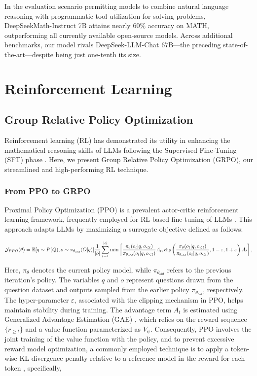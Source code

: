 \begin{itemize}[topsep=0pt]
\begin{itemize}[topsep=0pt]
In the evaluation scenario permitting models to combine natural language reasoning with programmatic tool utilization for solving problems, DeepSeekMath-Instruct 7B attains nearly 60\% accuracy on MATH, outperforming all currently available open-source models. Across additional benchmarks, our model rivals DeepSeek-LLM-Chat 67B—the preceding state-of-the-art—despite being just one-tenth its size.
\section{Reinforcement Learning}

\subsection{Group Relative Policy Optimization} Reinforcement learning (RL) has demonstrated its utility in enhancing the mathematical reasoning skills of LLMs following the Supervised Fine-Tuning (SFT) phase \citep{wang2023math,wizardmath}. Here, we present Group Relative Policy Optimization (GRPO), our streamlined and high-performing RL technique.

\subsubsection{From PPO to GRPO} Proximal Policy Optimization (PPO) \citep{schulman2017proximal} is a prevalent actor-critic reinforcement learning framework, frequently employed for RL-based fine-tuning of LLMs \citep{ouyang2022training}. This approach adapts LLMs by maximizing a surrogate objective defined as follows:

\begin{equation}
\footnotesize
    \mathcal{J}_{PPO}(\theta) = \mathbb{E}{[q \sim P(Q), o \sim \pi_{\theta_{old}}(O|q)]} \frac{1}{|o|} \sum_{t=1}^{|o|} \min \left[ \frac{\pi_\theta(o_{t} | q, o_{<t})}{\pi_{\theta_{old}}(o_{t} | q, o_{<t})} A_{t}, \text{clip} \left( \frac{\pi_\theta(o_{t} | q, o_{<t})}{\pi_{\theta_{old}}(o_{t} | q, o_{<t})}, 1 - \varepsilon, 1 + \varepsilon \right)  A_{t} \right] ,
\end{equation}

Here, $\pi_{\theta}$ denotes the current policy model, while $\pi_{\theta_{old}}$ refers to the previous iteration’s policy. The variables $q$ and $o$ represent questions drawn from the question dataset and outputs sampled from the earlier policy $\pi_{\theta_{old}}$, respectively. The hyper-parameter $\varepsilon$, associated with the clipping mechanism in PPO, helps maintain stability during training. The advantage term $A_t$ is estimated using Generalized Advantage Estimation (GAE) \citep{gae}, which relies on the reward sequence $\{r_{\ge t}\}$ and a value function parameterized as $V_{\psi}$. Consequently, PPO involves the joint training of the value function with the policy, and to prevent excessive reward model optimization, a commonly employed technique is to apply a token-wise KL divergence penalty relative to a reference model in the reward for each token \citep{ouyang2022training}, specifically,


\end{itemize}
\end{itemize}
